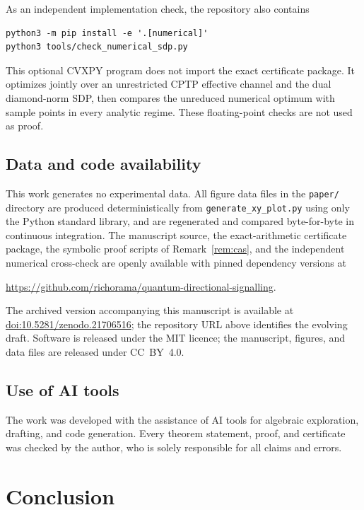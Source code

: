 \documentclass[11pt,a4paper]{article}
\theoremstyle{remark}
\begin{document}
As an independent implementation check, the repository also contains
\begin{verbatim}
python3 -m pip install -e '.[numerical]'
python3 tools/check_numerical_sdp.py
\end{verbatim}
This optional CVXPY program does not import the exact certificate package.  It
optimizes jointly over an unrestricted CPTP effective channel and the dual
diamond-norm SDP, then compares the unreduced numerical optimum with sample
points in every analytic regime.  These floating-point checks are not used as
proof.

\subsection*{Data and code availability}

This work generates no experimental data.  All figure data files in the
\texttt{paper/} directory are produced deterministically from
\texttt{generate\_xy\_plot.py} using only the Python standard library, and are
regenerated and compared byte-for-byte in continuous integration.  The
manuscript source, the exact-arithmetic certificate package, the symbolic
proof scripts of Remark~\ref{rem:cas}, and the independent numerical
cross-check are openly available with pinned dependency versions at
\begin{center}
\url{https://github.com/richorama/quantum-directional-signalling}.
\end{center}
The archived version accompanying this manuscript is available at
\href{https://doi.org/10.5281/zenodo.21706516}
{doi:10.5281/zenodo.21706516}; the repository URL above identifies the
evolving draft.
Software is released
under the MIT licence; the manuscript, figures, and data files are released
under CC~BY~4.0.

\subsection*{Use of AI tools}

The work was developed with the assistance of AI tools for algebraic
exploration, drafting, and code generation.  Every theorem statement, proof,
and certificate was checked by the author, who is solely responsible for all
claims and errors.

\section{Conclusion}
\end{document}
